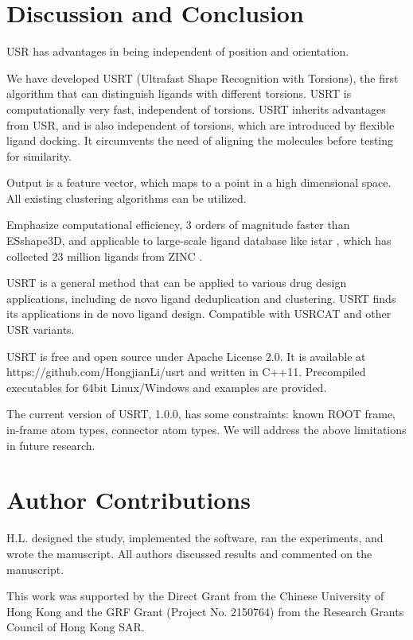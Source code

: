 \documentclass[twocolumn]{svjour3}          %
\begin{document}
\section{Discussion and Conclusion}

USR has advantages in being independent of position and orientation.

We have developed USRT (Ultrafast Shape Recognition with Torsions), the first algorithm that can distinguish ligands with different torsions. USRT is computationally very fast, independent of torsions. USRT inherits advantages from USR, and is also independent of torsions, which are introduced by flexible ligand docking. It circumvents the need of aligning the molecules before testing for similarity.

Output is a feature vector, which maps to a point in a high dimensional space. All existing clustering algorithms can be utilized.

Emphasize computational efficiency, 3 orders of magnitude faster than ESshape3D, and applicable to large-scale ligand database like istar \cite{1362}, which has collected 23 million ligands from ZINC \cite{532,1178}.

USRT is a general method that can be applied to various drug design applications, including de novo ligand deduplication and clustering. USRT finds its applications in de novo ligand design. Compatible with USRCAT \cite{1331} and other USR variants.

USRT is free and open source under Apache License 2.0. It is available at https://github.com/HongjianLi/usrt and written in C++11. Precompiled executables for 64bit Linux/Windows and examples are provided.

The current version of USRT, 1.0.0, has some constraints: known ROOT frame, in-frame atom types, connector atom types. We will address the above limitations in future research.

\section{Author Contributions}

H.L. designed the study, implemented the software, ran the experiments, and wrote the manuscript. All authors discussed results and commented on the manuscript.

\begin{acknowledgements}

This work was supported by the Direct Grant from the Chinese University of Hong Kong and the GRF Grant (Project No. 2150764) from the Research Grants Council of Hong Kong SAR.

\end{acknowledgements}

\end{document}
